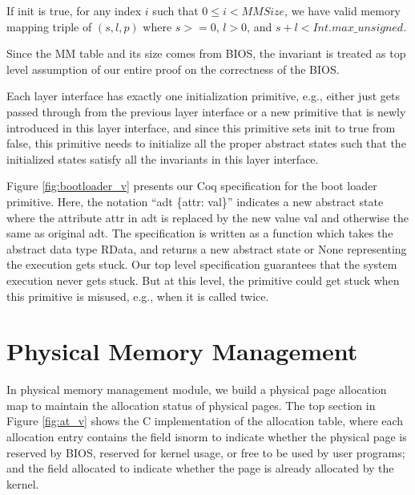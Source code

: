 \begin{invariant}[MM valid]
If \textsf{init} is \textsf{true}, for any index $i$ such that $0\le i<MMSize$, we have valid memory mapping
triple of $(s, l, p)$ where $s >= 0$, $l > 0$, and $s + l < Int.max\_unsigned$.
\end{invariant}

Since the MM table and its size comes from BIOS, the invariant is treated as top level
assumption of our entire proof on the correctness of the BIOS. 

Each layer interface has exactly one initialization primitive, e.g., either just gets passed through
from the previous layer interface or a new primitive that is newly introduced in this layer
interface, and since this primitive sets \textsf{init}
to \textsf{true} from \textsf{false}, this primitive needs to initialize all the proper abstract states
such that the initialized states satisfy all the invariants in this layer interface.

Figure \ref{fig:bootloader_v} presents our Coq specification for the boot loader primitive.
Here, the notation ``\textsf{adt \{attr: val\}}'' indicates a new abstract state where the attribute
\textsf{attr} in \textsf{adt} is replaced by the new value \textsf{val} and otherwise the same
as original \textsf{adt}.
The specification is written as a function which takes the abstract data type \textsf{RData},
and returns a new abstract state or \textsf{None} representing the execution gets stuck.
Our top level specification guarantees that the system execution never gets stuck.
But at this level, the primitive could get stuck when this primitive is misused, e.g., when it is called twice.


\section{Physical Memory Management}

In physical memory management module, we build a physical page allocation map to maintain the
allocation status of physical pages.
The top section in Figure \ref{fig:at_v} shows
the C implementation of the allocation table, where each allocation entry contains the field \textsf{isnorm}
to indicate whether the
physical page is reserved by BIOS, reserved for kernel usage, or free to be used by user programs;
and the field \textsf{allocated} to indicate whether the page is already allocated by the kernel.

